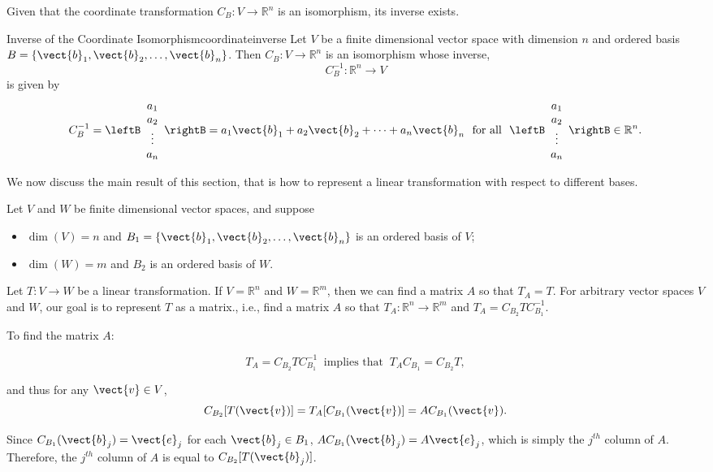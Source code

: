 Given that the coordinate transformation $C_B:V\to\mathbb{R}^n$ is an isomorphism, its inverse exists. 

\begin{theorem}{Inverse of the Coordinate Isomorphism}{coordinateinverse}
Let $V$ be a finite dimensional vector space with dimension $n$
and ordered basis $B=\{\vect{b}_1, \vect{b}_2, \ldots, \vect{b}_n\}$.
Then $C_B:V\to\mathbb{R}^n$ is an isomorphism whose inverse,
\[ C_B^{-1}:\mathbb{R}^n\to V\]
is given by
\[  C_B^{-1} =\leftB\begin{array}{c}
a_1 \\ a_2 \\ \vdots \\ a_n \end{array}\rightB =
a_1\vect{b}_1 + a_2\vect{b}_2 + \cdots + a_n\vect{b}_n
~\mbox{ for all }~
\leftB\begin{array}{c}
a_1 \\ a_2 \\ \vdots \\ a_n \end{array}\rightB \in\mathbb{R}^n.  \]
\end{theorem}

We now discuss the main result of this section, that is how
to represent a linear transformation with respect to different
bases.

Let $V$ and $W$ be finite dimensional vector spaces, and suppose
\begin{itemize}
\item $\dim(V)=n$ and $B_1=\{\vect{b}_1, \vect{b}_2, \ldots, \vect{b}_n\}$
is an ordered basis of $V$;
\item $\dim(W)=m$ and $B_2$ is an ordered basis of $W$.
\end{itemize}
Let $T:V\to W$ be a linear transformation.
If $V=\mathbb{R}^n$ and $W=\mathbb{R}^m$, then we can find a
matrix $A$ so that $T_A=T$. For arbitrary vector spaces $V$ and $W$, 
our goal is to represent $T$ as a matrix.,
i.e., 
find a matrix $A$ so that $T_A:\mathbb{R}^n\to\mathbb{R}^m$
and $T_A=C_{B_2}TC_{B_1}^{-1}$.

To find the matrix $A$:

\[ T_A=C_{B_2}TC_{B_1}^{-1}~\mbox{ implies that }~
T_AC_{B_1}=C_{B_2}T,\]

and thus for any $\vect{v}\in V$, 
\[ C_{B_2}[T(\vect{v})] = T_A[C_{B_1}(\vect{v})] 
=AC_{B_1}(\vect{v}).\]

Since $C_{B_1}(\vect{b}_j)=\vect{e}_j$
for each $\vect{b}_j\in B_1$,
$AC_{B_1}(\vect{b}_j)=A\vect{e}_j$, which is simply the
$j^{th}$ column of $A$.
Therefore, the $j^{th}$ column of $A$ is equal to $C_{B_2}[T(\vect{b}_j)]$.

